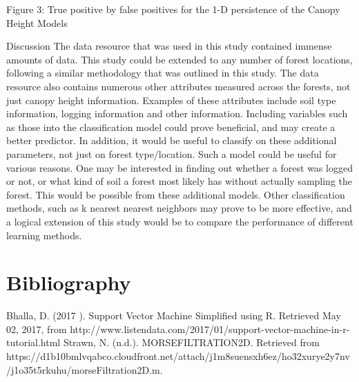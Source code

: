 \documentclass[10pt]{article}
\begin{document}
Figure 3: True positive by false positives for the 1-D persistence of the Canopy Height Models

Discussion
	The data resource that was used in this study contained immense amounts of data. This study could be extended to any number of forest locations, following a similar methodology that was outlined in this study. The data resource also contains numerous other attributes measured across the forests, not just canopy height information. Examples of these attributes include soil type information, logging information and other information. Including variables such as those into the classification model could prove beneficial, and may create a better predictor. In addition, it would be useful to classify on these additional parameters, not just on forest type/location. Such a model could be useful for various reasons. One may be interested in finding out whether a forest was logged or not, or what kind of soil a forest most likely has without actually sampling the forest. This would be possible from these additional models. Other classification methods, such as k nearest nearest neighbors may prove to be more effective, and a logical extension of this study would be to compare the performance of different learning methods.

\section*{Bibliography}
Bhalla, D. (2017 ). Support Vector Machine Simplified using R. Retrieved May 02, 2017, from http://www.listendata.com/2017/01/support-vector-machine-in-r-tutorial.html
Strawn, N. (n.d.). MORSEFILTRATION2D. Retrieved from https://d1b10bmlvqabco.cloudfront.net/attach/j1m8suensxh6ez/ho32xurye2y7nv/j1o35t5rkuhu/morseFiltration2D.m.
\end{document}
